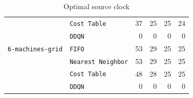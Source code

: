 \documentclass[sn-mathphys]{sn-jnl}
\begin{document}
\begin{table}[ht]
\begin{tabular}{|l|l||r|r|r|r|}
 & \texttt{Cost Table} & 37  \quad & 25  \quad & 25  \quad & 24  \quad  \\ 
 & \texttt{DDQN} & 0  \quad & 0  \quad & 0  \quad & 0  \quad  \\ 
\hline \texttt{6-machines-grid} & \texttt{FIFO}& 53  \quad & 29  \quad & 25  \quad & 25  \quad  \\ 
 & \texttt{Nearest Neighbor} & 53  \quad & 29  \quad & 25  \quad & 25  \quad  \\ 
 & \texttt{Cost Table} & 48  \quad & 28  \quad & 25  \quad & 25  \quad  \\ 
 & \texttt{DDQN} & 0  \quad & 0  \quad & 0  \quad & 0  \quad  \\ 
\hline
\end{tabular}

\egroup
\caption{Optimal source clock}
\label{tab:results_optimal_clock}
\end{table}
    
\end{document}

